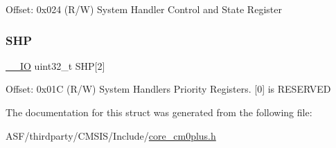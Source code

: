 Offset\+: 0x024 (R/W) System Handler Control and State Register \mbox{\label{struct_s_c_b___type_a70aade06546bce9391e17d9b44beb3a7}} 
\subsubsection{\texorpdfstring{SHP}{SHP}}
{\footnotesize\ttfamily \mbox{\hyperlink{core__cm0plus_8h_aec43007d9998a0a0e01faede4133d6be}{\+\_\+\+\_\+\+IO}} uint32\+\_\+t S\+HP\mbox{[}2\mbox{]}}

Offset\+: 0x01C (R/W) System Handlers Priority Registers. \mbox{[}0\mbox{]} is R\+E\+S\+E\+R\+V\+ED 

The documentation for this struct was generated from the following file\+:\begin{DoxyCompactItemize}
\item 
A\+S\+F/thirdparty/\+C\+M\+S\+I\+S/\+Include/\mbox{\hyperlink{core__cm0plus_8h}{core\+\_\+cm0plus.\+h}}\end{DoxyCompactItemize}
